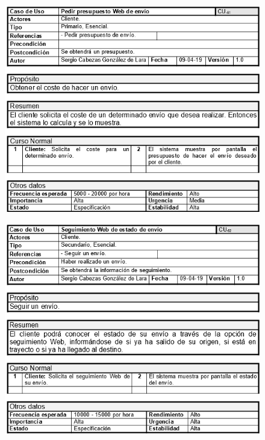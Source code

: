 \begin{figure}[H]
	\centering
	\includegraphics[width=16cm]{51}
\end{figure}
\begin{figure}[H]
	\centering
	\includegraphics[width=16cm]{52}
\end{figure}
